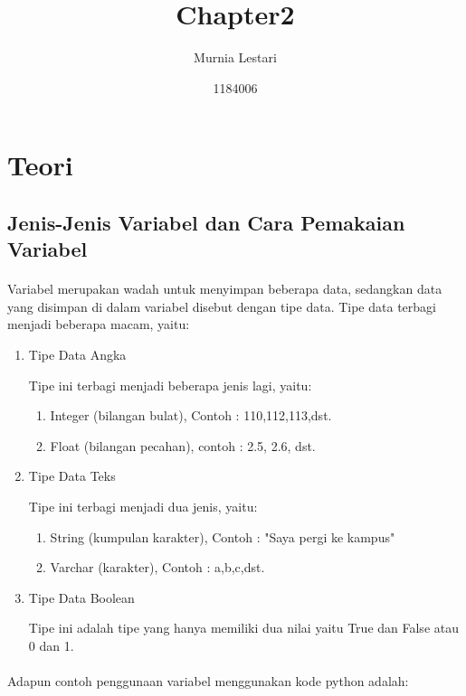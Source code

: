 \documentclass{article}
\title{Chapter2}
\author{Murnia Lestari }
\date{1184006}
\begin{document}
\maketitle


\section{Teori}
\subsection{Jenis-Jenis Variabel dan Cara Pemakaian Variabel}
\paragraph{}
    Variabel merupakan wadah untuk menyimpan beberapa  data, sedangkan data yang disimpan di dalam variabel disebut dengan tipe data. Tipe data terbagi menjadi beberapa macam, yaitu:
    \begin{enumerate}
        \item Tipe Data Angka
            \par Tipe ini terbagi menjadi beberapa jenis lagi, yaitu: 
            \par \begin{enumerate}
                \item Integer (bilangan bulat), Contoh : 110,112,113,dst.
                \item Float (bilangan pecahan), contoh : 2.5, 2.6, dst.
                \end{enumerate}
        \item Tipe Data Teks
            \par Tipe ini terbagi menjadi dua jenis, yaitu:
            \par \begin{enumerate}
                \item String (kumpulan karakter), Contoh : "Saya pergi ke kampus"
                \item Varchar (karakter), Contoh : a,b,c,dst.
            \end{enumerate}
        \item Tipe Data Boolean
        \par Tipe ini adalah tipe yang hanya memiliki dua nilai yaitu True dan False atau 0 dan 1.
    \end{enumerate}
\paragraph{} Adapun contoh penggunaan variabel menggunakan kode python adalah:
\end{document}
